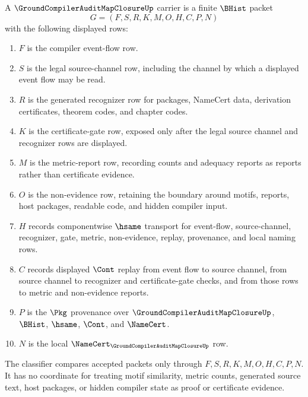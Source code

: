 \begin{definition}
\label{def:groundcompiler-audit-map-closure-carrier}
A $\GroundCompilerAuditMapClosureUp$ carrier is a finite $\BHist$ packet
$$
G=(F,S,R,K,M,O,H,C,P,N)
$$
with the following displayed rows:
\begin{enumerate}
\item $F$ is the compiler event-flow row.
\item $S$ is the legal source-channel row, including the channel by which a displayed event flow may be read.
\item $R$ is the generated recognizer row for packages, NameCert data, derivation certificates, theorem codes, and chapter codes.
\item $K$ is the certificate-gate row, exposed only after the legal source channel and recognizer rows are displayed.
\item $M$ is the metric-report row, recording counts and adequacy reports as reports rather than certificate evidence.
\item $O$ is the non-evidence row, retaining the boundary around motifs, reports, host packages, readable code, and hidden compiler input.
\item $H$ records componentwise $\hsame$ transport for event-flow, source-channel, recognizer, gate, metric, non-evidence, replay, provenance, and local naming rows.
\item $C$ records displayed $\Cont$ replay from event flow to source channel, from source channel to recognizer and certificate-gate checks, and from those rows to metric and non-evidence reports.
\item $P$ is the $\Pkg$ provenance over $\GroundCompilerAuditMapClosureUp$, $\BHist$, $\hsame$, $\Cont$, and $\NameCert$.
\item $N$ is the local $\NameCert_{\GroundCompilerAuditMapClosureUp}$ row.
\end{enumerate}
The classifier compares accepted packets only through $F,S,R,K,M,O,H,C,P,N$. It has no coordinate for treating motif similarity, metric counts, generated source text, host packages, or hidden compiler state as proof or certificate evidence.
\end{definition}

